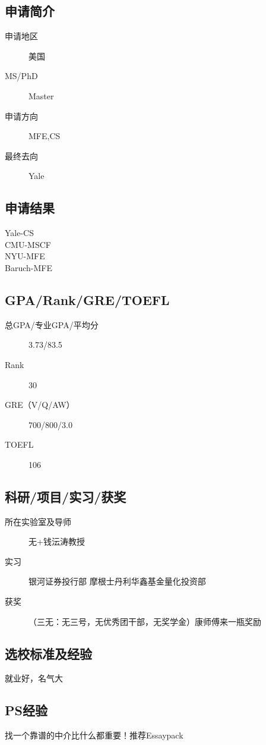 \documentclass[11pt,fleqn,openany]{book} %
\begin{document}
\noindent\begin{minipage}[t]{0.45\textwidth}
\subsection*{申请简介}
\begin{description}
\item[申请地区] 美国
\item[MS/PhD] Master
\item[申请方向] MFE,CS
\item[最终去向] Yale
\end{description}
\end{minipage}
\hfill
\begin{minipage}[t]{0.45\textwidth}
\subsection*{申请结果}
\noindent Yale-CS\\
CMU-MSCF\\
NYU-MFE\\
Baruch-MFE
\end{minipage}
\subsection*{GPA/Rank/GRE/TOEFL}
\begin{description}
\item[总GPA/专业GPA/平均分] 3.73/83.5
\item[Rank] 30
\item[GRE（V/Q/AW）] 700/800/3.0
\item[TOEFL] 106
\end{description}

\subsection*{科研/项目/实习/获奖}
\begin{description}
\item[所在实验室及导师] 无+钱沄涛教授
\item[实习] 银河证券投行部
摩根士丹利华鑫基金量化投资部
\item[获奖] （三无：无三号，无优秀团干部，无奖学金）康师傅来一瓶奖励
\end{description}
\subsection*{选校标准及经验}
就业好，名气大
\subsection*{PS经验}
找一个靠谱的中介比什么都重要！推荐Essaypack
\end{document}
